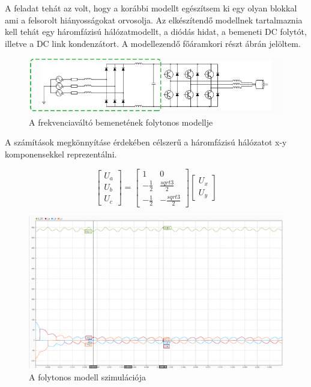 A feladat tehát az volt, hogy a korábbi modellt egészítsem ki egy olyan blokkal ami a felsorolt hiányosságokat orvosolja. Az elkészítendő modellnek tartalmaznia kell tehát egy háromfázisú hálózatmodellt, a diódás hidat, a bemeneti DC folytót, illetve a DC link kondenzátort. A modellezendő főáramkori részt  ábrán jelöltem. 

\begin{figure}[H!]
	\centering
	\includegraphics[width = \textwidth]{figures/VFDschematic_choke_marked.png}
	\caption{A frekvenciaváltó bemenetének folytonos modellje} 
	\label{fig:input_marked}
\end{figure}

A számítások megkönnyításe érdekében célszerű a háromfázisú hálózatot x-y komponensekkel reprezentálni.


\begin{equation}

\begin{bmatrix}
       U_a\\[0.3em]
       U_b\\[0.3em]
       U_c          
\end{bmatrix}
=
\begin{bmatrix}
       1 & 0      \\[0.3em]
       -\frac{1}{2} & \frac{sqrt{3}}{2}       \\[0.3em]
       -\frac{1}{2} & -\frac{sqrt{3}}{2}
\end{bmatrix}
\begin{bmatrix}
       U_x\\[0.3em]
       U_y         
\end{bmatrix}


\end{equation}

\begin{figure}[H!]
	\centering
	\includegraphics[width = \textwidth]{figures/continous_testrun_1.png}
	\caption{A folytonos modell szimulációja} 
	\label{fig:cont_run}
\end{figure}




